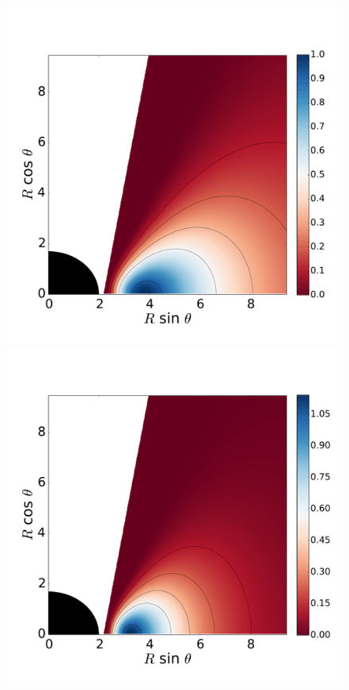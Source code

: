 \documentclass[twocolumn,aps,showpacs,showkeys,prd,superscriptaddress,byrevtex, amsmath]{revtex4-1}
\begin{document}
\begin{figure}
\\
\includegraphics[scale=0.14]{figures/fig10_09_10.pdf}
\hspace{-0.3cm}
\includegraphics[scale=0.14]{figures/fig10_09_1.pdf}

\end{figure}
\end{document}
